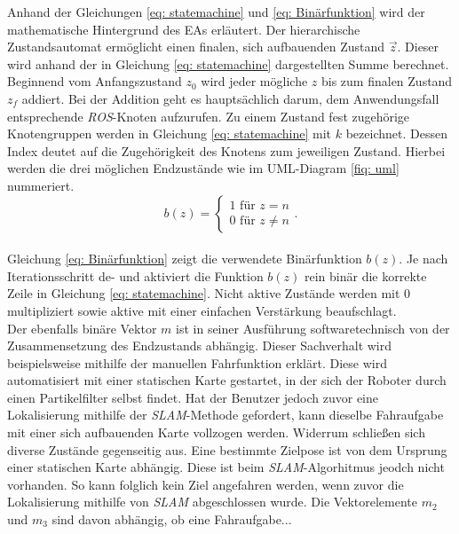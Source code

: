 		Anhand der Gleichungen \ref{eq: statemachine} und \ref{eq: Binärfunktion} wird der mathematische Hintergrund des EAs erläutert. Der hierarchische Zustandsautomat ermöglicht einen finalen, sich aufbauenden Zustand $\vec{z}$. Dieser wird anhand der in Gleichung \ref{eq: statemachine} dargestellten Summe berechnet. Beginnend vom Anfangszustand $z_0$ wird jeder mögliche $z$ bis zum finalen Zustand $z_f$ addiert. Bei der Addition geht es hauptsächlich darum, dem Anwendungsfall entsprechende \textit{ROS}-Knoten aufzurufen. Zu einem Zustand fest zugehörige Knotengruppen werden in Gleichung \ref{eq: statemachine} mit $k$ bezeichnet. Dessen Index deutet auf die Zugehörigkeit des Knotens zum jeweiligen Zustand. Hierbei werden die drei möglichen Endzustände wie im UML-Diagram \ref{fiq: uml} nummeriert.\\
	
	\begin{equation}
	b(z)=\left\{\begin{array}{ll} 1 \text{ für } z=n \\
	0 \text{ für }z\neq n\end{array}\right. .
	\label{eq: Binärfunktion}
	\end{equation}\\
		
		Gleichung \ref{eq: Binärfunktion} zeigt die verwendete Binärfunktion $b(z)$. Je nach Iterationsschritt de- und aktiviert die Funktion $b(z)$ rein binär die korrekte Zeile in Gleichung \ref{eq: statemachine}. Nicht aktive Zustände werden mit 0 multipliziert sowie aktive mit einer einfachen Verstärkung beaufschlagt. \\
		
		Der ebenfalls binäre Vektor $m$ ist in seiner Ausführung softwaretechnisch von der Zusammensetzung des Endzustands abhängig. Dieser Sachverhalt wird beispielsweise mithilfe der manuellen Fahrfunktion erklärt. Diese wird automatisiert mit einer statischen Karte gestartet, in der sich der Roboter durch einen Partikelfilter selbst findet. Hat der Benutzer jedoch zuvor eine Lokalisierung mithilfe der \textit{SLAM}-Methode gefordert, kann dieselbe Fahraufgabe mit einer sich aufbauenden Karte vollzogen werden. Widerrum schließen sich diverse Zustände gegenseitig aus. Eine bestimmte Zielpose ist von dem Ursprung einer statischen Karte abhängig. Diese ist beim \textit{SLAM}-Algorhitmus jeodch nicht vorhanden. So kann folglich kein Ziel angefahren werden, wenn zuvor die Lokalisierung mithilfe von \textit{SLAM} abgeschlossen wurde. Die Vektorelemente $m_2$ und $m_3$ sind davon abhängig, ob eine Fahraufgabe...
	
